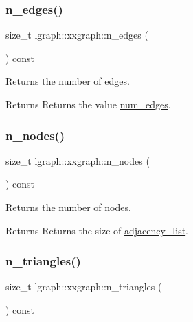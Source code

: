 \subsubsection{\texorpdfstring{n\+\_\+edges()}{n\_edges()}}
{\footnotesize\ttfamily size\+\_\+t lgraph\+::xxgraph\+::n\+\_\+edges (\begin{DoxyParamCaption}{ }\end{DoxyParamCaption}) const\hspace{0.3cm}{\ttfamily [inherited]}}



Returns the number of edges. 

\begin{DoxyReturn}{Returns}
Returns the value \hyperlink{classlgraph_1_1xxgraph_a6765a9a3be42f6e0f824635c593b35d7}{num\+\_\+edges}. 
\end{DoxyReturn}
\mbox{\label{classlgraph_1_1xxgraph_a67f651617ada4053b569102b9a54cab0}} 
\subsubsection{\texorpdfstring{n\+\_\+nodes()}{n\_nodes()}}
{\footnotesize\ttfamily size\+\_\+t lgraph\+::xxgraph\+::n\+\_\+nodes (\begin{DoxyParamCaption}{ }\end{DoxyParamCaption}) const\hspace{0.3cm}{\ttfamily [inherited]}}



Returns the number of nodes. 

\begin{DoxyReturn}{Returns}
Returns the size of \hyperlink{classlgraph_1_1xxgraph_a31cf82d0b20be05290be259dc97a51ec}{adjacency\+\_\+list}. 
\end{DoxyReturn}
\mbox{\label{classlgraph_1_1xxgraph_a90a9b60caf18179576af61dc962b95e3}} 
\subsubsection{\texorpdfstring{n\+\_\+triangles()}{n\_triangles()}}
{\footnotesize\ttfamily size\+\_\+t lgraph\+::xxgraph\+::n\+\_\+triangles (\begin{DoxyParamCaption}{ }\end{DoxyParamCaption}) const\hspace{0.3cm}{\ttfamily [inherited]}}



